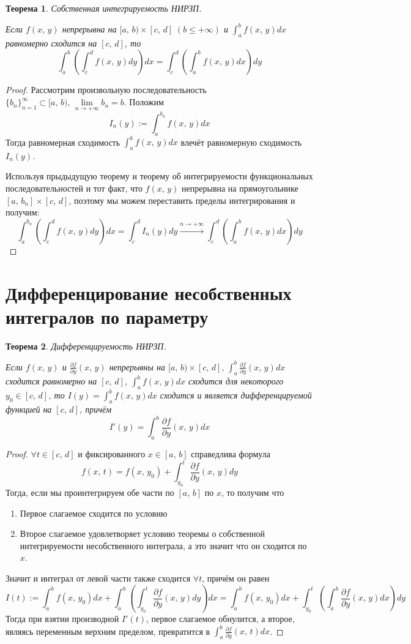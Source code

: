 \documentclass[a4paper,12pt]{article}
\renewcommand{\leq}{\ensuremath{\leqslant}}
\theoremstyle{plain}
\newtheorem{theorem}{Теорема}[section]
\theoremstyle{definition}
\theoremstyle{remark}
\begin{document}
\begin{theorem}
	Собственная интегрируемость НИРЗП.

	Если $f(x,\,y)$ непрерывна на $[a,\,b) \times [c,\,d]\;(b \leq +\infty)$ и $\int_a^b f(x,\,y)dx$ равномерно сходится на $[c,\,d]$, то
	\[\int_a^b \left(\int_c^d f(x,\,y)dy\right)dx = \int_c^d\left(\int_a^b f(x,\,y)dx\right)dy\]
\end{theorem}
\begin{proof}
	Рассмотрим произвольную последовательность $\{b_n\}_{n = 1}^\infty \subset [a,\,b),\, \lim\limits_{n\to +\infty} b_n = b$. Положим
	\[I_n(y) := \int_a^{b_n}f(x,\,y)dx\]
	Тогда равномерная сходимость $\int_a^b f(x,\,y)dx$ влечёт равномерную сходимость $I_n(y)$.

	Используя прыдыдущую теорему и теорему об интегрируемости функциональных последовательностей и тот факт, что $f(x,\,y)$ непрерывна на прямоугольнике $[a,\,b_n]\times [c,\,d]$, поэтому мы можем переставить пределы интегрирования и получим:
	\[\int_a^{b_n}\left(\int_c^d f(x,\,y)dy\right)dx = \int_c^d I_n(y)dy \stackrel{n \to +\infty}{\to} \int_c^d \left(\int_a^b f(x,\,y)dx\right)dy\]
\end{proof}

\section{Дифференцирование несобственных интегралов по параметру}
\begin{theorem}
	Дифференцируемость НИРЗП.

	Если $f(x,\,y)$ и $\frac{\partial f}{\partial y}(x,\,y)$ непрерывны на $[a,\,b) \times [c,\,d],\, \int_a^b \frac{\partial f}{\partial y}(x,\,y)dx$ сходится равномерно на $[c,\,d]$, $\int_a^b f(x,\,y)dx$ сходится для некоторого $y_0 \in [c,\,d]$, то $I(y) = \int_a^b f(x,\,y)dx$ сходится и является дифференцируемой функцией на $[c,\,d]$, причём
	\[I'(y) = \int_a^b \frac{\partial f}{\partial y}(x,\,y)dx\]
\end{theorem}
\begin{proof}
	$\forall t \in [c,\,d]$ и фиксированного $x \in [a,\,b]$ справедлива формула
	\[f(x,\,t) = f(x,\,y_0) + \int_{y_0}^t \frac{\partial f}{\partial y}(x,\,y)dy\]
	Тогда, если мы проинтегрируем обе части по $[a,\,b]$ по $x$, то получим что
	\begin{enumerate}
		\item Первое слагаемое сходится по условию
		\item Второе слагаемое удовлетворяет условию теоремы о собственной интегрируемости несобственного интеграла, а это значит что он сходится по $x$.
	\end{enumerate}
	Значит и интеграл от левой части также сходится $\forall t$, причём он равен
	\[I(t) := \int_a^b f(x,\,y_0)dx + \int_a^b \left(\int_{y_0}^t \frac{\partial f}{\partial y}(x,\,y)dy\right)dx = \int_a^b f(x,\,y_0)dx + \int_{y_0}^t \left(\int_a^b \frac{\partial f}{\partial y}(x,\,y) dx\right)dy\]
	Тогда при взятии производной $I'(t)$, первое слагаемое обнулится, а второе, являясь переменным верхним пределом, превратится в $\int_a^b \frac{\partial f}{\partial y}(x,\,t) dx$.
\end{proof}
\end{document}
